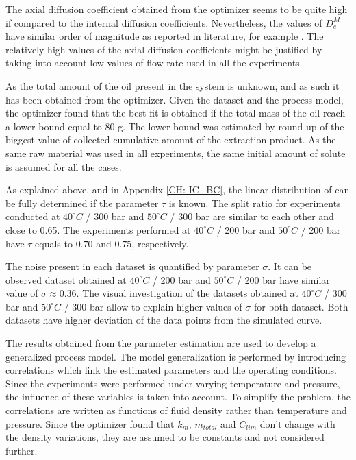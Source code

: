 \documentclass[../Article_Model_Parameters.tex]{subfiles}
\begin{document}
	
	The axial diffusion coefficient obtained from the optimizer seems to be quite high if compared to the internal diffusion coefficients. Nevertheless, the values of $D_e^M$ have similar order of magnitude as reported in literature, for example \citet{ReisVasco2000}. The relatively high values of the axial diffusion coefficients might be justified by taking into account low values of flow rate used in all the experiments.
	
	As the total amount of the oil present in the system is unknown, and as such it has been obtained from the optimizer. Given the dataset and the process model, the optimizer found that the best fit is obtained if the total mass of the oil reach a lower bound equal to 80 g. The lower bound was estimated by round up of the biggest value of collected cumulative amount of the extraction product. As the same raw material was used in all experiments, the same initial amount of solute is assumed for all the cases.
	
	As explained above, and in Appendix \ref{CH: IC_BC}, the linear distribution of can be fully determined if the parameter $\tau$ is known. The split ratio for experiments conducted at $40 ^\circ C$ / 300 bar and $50 ^\circ C$ / 300 bar are similar to each other and close to 0.65. The experiments performed at $40 ^\circ C$ / 200 bar and $50 ^\circ C$ / 200 bar have $\tau$ equals to $0.70$ and $0.75$, respectively. 
	
	The noise present in each dataset is quantified by parameter $\sigma$. It can be observed dataset obtained at $40 ^\circ C$ / 200 bar and $50 ^\circ C$ / 200 bar have similar value of $\sigma\approx0.36$. The visual investigation of the datasets obtained at $40 ^\circ C$ / 300 bar and $50 ^\circ C$ / 300 bar allow to explain higher values of $\sigma$ for both dataset. Both datasets have higher deviation of the data points from the simulated curve.

	The results obtained from the parameter estimation are used to develop a generalized process model. The model generalization is performed by introducing correlations which link the estimated parameters and the operating conditions. Since the experiments were performed under varying temperature and pressure, the influence of these variables is taken into account. To simplify the problem, the correlations are written as functions of fluid density rather than temperature and pressure. Since the optimizer found that $k_m$, $m_{total}$ and $C_{lim}$ don't change with the density variations, they are assumed to be constants and not considered further.
		
\end{document}

